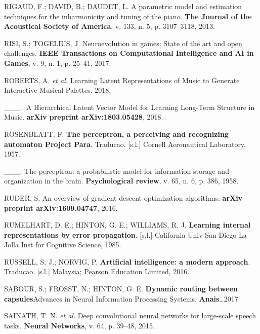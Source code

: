 \documentclass[]{article}
\begin{document}
\leavevmode\hypertarget{ref-rigaud2013parametric}{}%
RIGAUD, F.; DAVID, B.; DAUDET, L. A parametric model and estimation
techniques for the inharmonicity and tuning of the piano. \textbf{The
Journal of the Acoustical Society of America}, v. 133, n. 5, p.
3107--3118, 2013.

\leavevmode\hypertarget{ref-risi2017neuroevolution}{}%
RISI, S.; TOGELIUS, J. Neuroevolution in games: State of the art and
open challenges. \textbf{IEEE Transactions on Computational Intelligence
and AI in Games}, v. 9, n. 1, p. 25--41, 2017.

\leavevmode\hypertarget{ref-roberts2018learning}{}%
ROBERTS, A. \emph{et al.} Learning Latent Representations of Music to
Generate Interactive Musical Palettes. 2018.

\leavevmode\hypertarget{ref-roberts2018hierarchical}{}%
\_\_\_.. A Hierarchical Latent Vector Model for Learning Long-Term
Structure in Music. \textbf{arXiv preprint arXiv:1803.05428}, 2018.

\leavevmode\hypertarget{ref-Rosenblatt57}{}%
ROSENBLATT, F. \textbf{The perceptron, a perceiving and recognizing
automaton Project Para}. Traducao. {[}s.l.{]} Cornell Aeronautical
Laboratory, 1957.

\leavevmode\hypertarget{ref-rosenblatt1958perceptron}{}%
\_\_\_. The perceptron: a probabilistic model for information storage
and organization in the brain. \textbf{Psychological review}, v. 65, n.
6, p. 386, 1958.

\leavevmode\hypertarget{ref-ruder2016overview}{}%
RUDER, S. An overview of gradient descent optimization algorithms.
\textbf{arXiv preprint arXiv:1609.04747}, 2016.

\leavevmode\hypertarget{ref-rumelhart1985learning}{}%
RUMELHART, D. E.; HINTON, G. E.; WILLIAMS, R. J. \textbf{Learning
internal representations by error propagation}. {[}s.l.{]} California
Univ San Diego La Jolla Inst for Cognitive Science, 1985.

\leavevmode\hypertarget{ref-russell2016artificial}{}%
RUSSELL, S. J.; NORVIG, P. \textbf{Artificial intelligence: a modern
approach}. Traducao. {[}s.l.{]} Malaysia; Pearson Education Limited,
2016.

\leavevmode\hypertarget{ref-sabour2017dynamic}{}%
SABOUR, S.; FROSST, N.; HINTON, G. E. \textbf{Dynamic routing between
capsules}Advances in Neural Information Processing Systems.
\textbf{Anais}\ldots{}2017

\leavevmode\hypertarget{ref-sainath2015deep}{}%
SAINATH, T. N. \emph{et al.} Deep convolutional neural networks for
large-scale speech tasks. \textbf{Neural Networks}, v. 64, p. 39--48,
2015.
\end{document}
